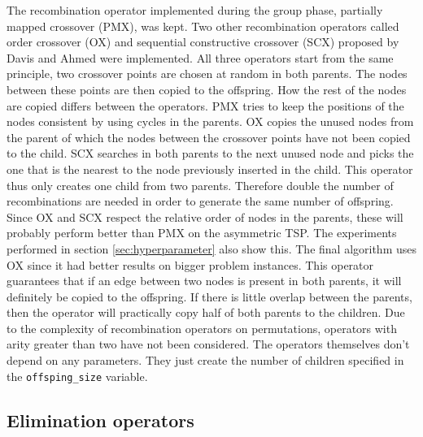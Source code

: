\documentclass[a4paper,10pt]{article}
\newcommand{\ReplaceMe}[1]{{\color{blue}#1}}
\begin{document}
The recombination operator implemented during the group phase, partially mapped crossover (PMX), was kept. Two other recombination operators called order crossover (OX) and sequential constructive crossover (SCX) proposed by Davis \cite{davis} and Ahmed \cite{ahmed} were implemented. All three operators start from the same principle, two crossover points are chosen at random in both parents. The nodes between these points are then copied to the offspring. How the rest of the nodes are copied differs between the operators. PMX tries to keep the positions of the nodes consistent by using cycles in the parents. OX copies the unused nodes from the parent of which the nodes between the crossover points have not been copied to the child. SCX searches in both parents to the next unused node and picks the one that is the nearest to the node previously inserted in the child. This operator thus only creates one child from two parents. Therefore double the number of recombinations are needed in order to generate the same number of offspring.\\
Since OX and SCX respect the relative order of nodes in the parents, these will probably perform better than PMX on the asymmetric TSP. The experiments performed in section \ref{sec:hyperparameter} also show this. The final algorithm uses OX since it had better results on bigger problem instances. This operator guarantees that if an edge between two nodes is present in both parents, it will definitely be copied to the offspring. If there is little overlap between the parents, then the operator will practically copy half of both parents to the children. Due to the complexity of recombination operators on permutations, operators with arity greater than two have not been considered. The operators themselves don't depend on any parameters. They just create the number of children specified in the \texttt{offsping\_size} variable.

\subsection{Elimination operators}

\end{document}
